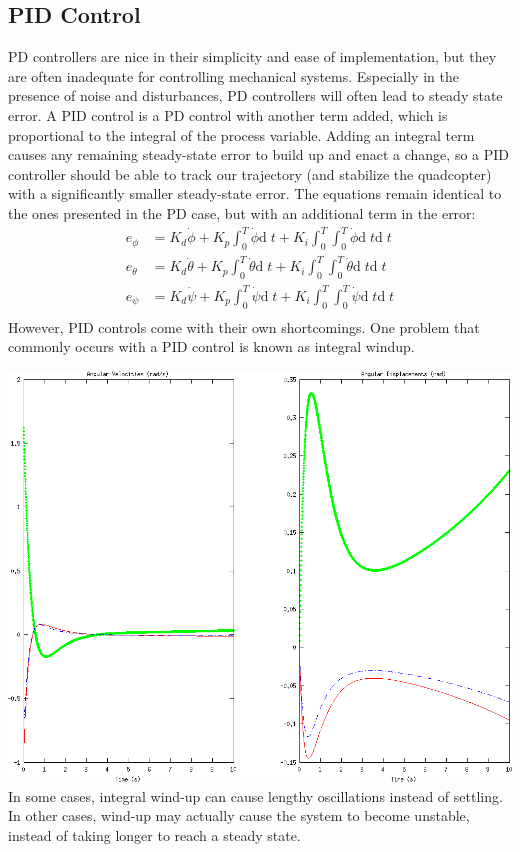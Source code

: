 \documentclass{article}
\newcommand\dd{\text{d}\;}
\begin{document}
\subsection*{PID Control}
PD controllers are nice in their simplicity and ease of implementation, but they are often
inadequate for controlling mechanical systems. Especially in the presence of noise and disturbances,
PD controllers will often lead to steady state error. A PID control is a PD control with another
term added, which is proportional to the integral of the process variable. Adding an integral term
causes any remaining steady-state error to build up and enact a change, so a PID controller should be able to track our
trajectory (and stabilize the quadcopter) with a significantly smaller steady-state error. The equations remain identical
to the ones presented in the PD case, but with an additional term in the error:
\begin{align*}
    e_\phi &= K_d\dot\phi + K_p \int_0^T\dot\phi\dd t + K_i \int_0^T\int_0^T\dot\phi\dd t\dd t \\
    e_\theta &= K_d\dot\theta + K_p \int_0^T\dot\theta\dd t + K_i \int_0^T\int_0^T\dot\theta\dd t\dd t \\
    e_\psi &= K_d\dot\psi + K_p \int_0^T\dot\psi\dd t + K_i \int_0^T\int_0^T\dot\psi\dd t\dd t \\
\end{align*}
However, PID controls come with their own shortcomings. One problem that commonly occurs with a PID control is known as integral windup. 
\begin{center}
    \includegraphics[scale=0.9]{images/windup.png} \\
    {
        In some cases, integral wind-up can cause lengthy oscillations instead of settling. In other cases,
        wind-up may actually cause the system to become unstable, instead of taking longer to reach
        a steady state.
    }
\end{center}
\end{document}
